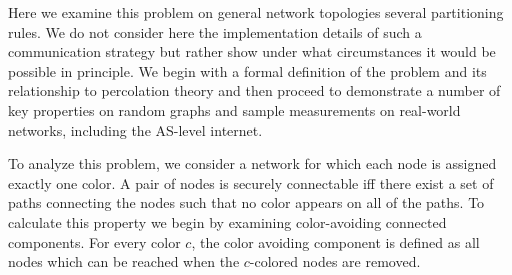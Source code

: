 \documentclass[aps, prl, twocolumn, a4paper, floatfix]{revtex4}
\begin{document}
Here we examine this problem on general network topologies several partitioning rules.  
We do not consider here the implementation details of such a communication strategy but rather show under what circumstances it would be possible in principle.
We begin with a formal definition of the problem and its relationship to percolation theory and then proceed to demonstrate a number of key properties on random graphs and sample measurements on real-world networks, including the AS-level internet.

To analyze this problem, we consider a network for which each node is assigned exactly one color.
A pair of nodes is securely connectable iff there exist a set of paths connecting the nodes such that no color appears on all of the paths.  
To calculate this property we begin by examining color-avoiding connected components.
For every color $c$, the color avoiding component is defined as all nodes which can be reached when the $c$-colored nodes are removed.
\end{document}
